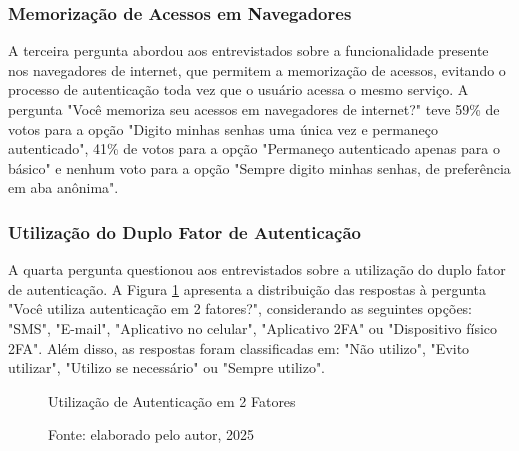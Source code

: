 \documentclass[12pt]{article}
\begin{document}
\subsubsection{Memorização de Acessos em Navegadores}

A terceira pergunta abordou aos entrevistados sobre a funcionalidade presente nos
navegadores de internet, que permitem a memorização de acessos, evitando o processo
de autenticação toda vez que o usuário acessa o mesmo serviço.
A pergunta "Você memoriza seu acessos em navegadores de internet?" teve 59\% de votos
para a opção "Digito minhas senhas uma única vez e permaneço autenticado", 41\% de
votos para a opção "Permaneço autenticado apenas para o básico" e nenhum voto para a
opção "Sempre digito minhas senhas, de preferência em aba anônima".

\subsubsection{Utilização do Duplo Fator de Autenticação}

A quarta pergunta questionou aos entrevistados sobre a utilização do duplo fator de
autenticação.
A Figura \ref{fig:resposta_4} apresenta a distribuição das respostas à pergunta
"Você utiliza autenticação em 2 fatores?", considerando as seguintes opções:
"SMS", "E-mail", "Aplicativo no celular", "Aplicativo 2FA" ou "Dispositivo físico 2FA".
Além disso, as respostas foram classificadas em: "Não utilizo", "Evito utilizar",
"Utilizo se necessário" ou "Sempre utilizo".

\begin{figure}[htb]
    \centering
    \caption{Utilização de Autenticação em 2 Fatores}
  \caption*{Fonte: elaborado pelo autor, 2025}
  \label{fig:resposta_4}
\end{figure}
\FloatBarrier
\end{document}
